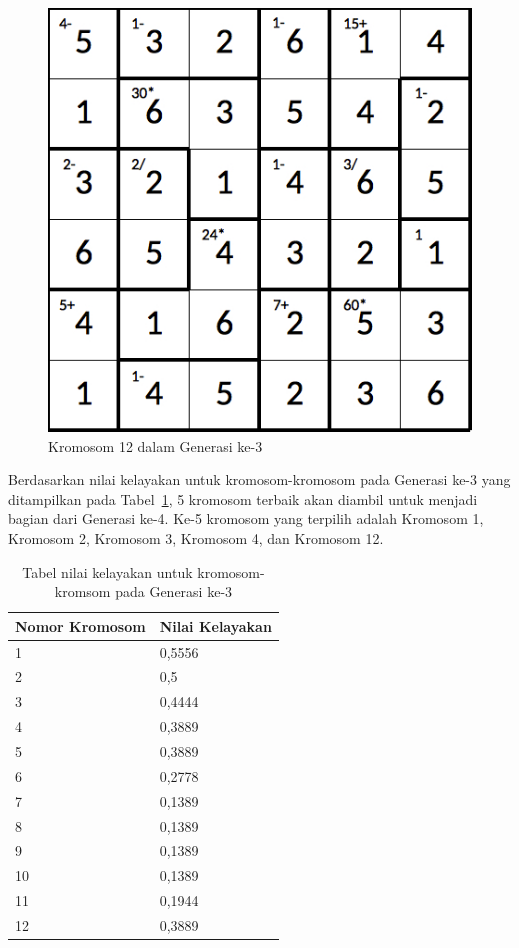 \begin{figure}
\centering
\captionsetup{justification=centering}
\includegraphics[scale=0.333]{Gambar/hybridgenetic/Generation3Chromosome12}
\caption[Kromosom 12 dalam Generasi ke-3]{Kromosom 12 dalam Generasi ke-3}
\label{fig:analisisg3k12}
\end{figure}

\clearpage

Berdasarkan nilai kelayakan untuk kromosom-kromosom pada Generasi ke-3 yang ditampilkan pada Tabel~\ref{tab:analisishg4}, 5 kromosom terbaik akan diambil untuk menjadi bagian dari Generasi ke-4. Ke-5 kromosom yang terpilih adalah Kromosom 1, Kromosom 2, Kromosom 3, Kromosom 4, dan Kromosom 12.

\begin{table}
\centering
\captionsetup{justification=centering}
\caption[Tabel nilai kelayakan untuk kromosom-kromsom pada Generasi ke-3]{Tabel nilai kelayakan untuk kromosom-kromsom pada Generasi ke-3}
\begin{tabular}{| l | l |}
\hline
Nomor Kromosom & Nilai Kelayakan \\
\hline \hline
1 & 0,5556 \\
\hline
2 & 0,5 \\
\hline
3 & 0,4444 \\
\hline
4 & 0,3889 \\
\hline
5 & 0,3889 \\
\hline
6 & 0,2778 \\
\hline
7 & 0,1389 \\
\hline
8 & 0,1389 \\
\hline
9 & 0,1389 \\
\hline
10 & 0,1389 \\
\hline
11 & 0,1944 \\
\hline
12 & 0,3889 \\
\hline
\end{tabular}
\label{tab:analisishg4}
\end{table}

